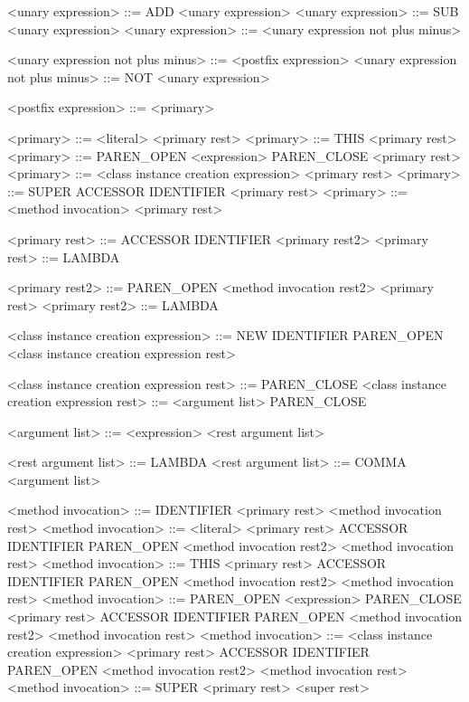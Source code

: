 <unary expression>                        ::= ADD <unary expression>
<unary expression>                        ::= SUB <unary expression>
<unary expression>                        ::= <unary expression not plus minus>

<unary expression not plus minus>         ::= <postfix expression>
<unary expression not plus minus>         ::= NOT <unary expression>

<postfix expression>                      ::= <primary>

<primary>                                 ::= <literal> <primary rest>
<primary>                                 ::= THIS <primary rest>
<primary>                                 ::= PAREN_OPEN <expression> PAREN_CLOSE <primary rest>
<primary>                                 ::= <class instance creation expression> <primary rest>
<primary>                                 ::= SUPER ACCESSOR IDENTIFIER <primary rest>
<primary>                                 ::= <method invocation> <primary rest>

<primary rest>                            ::= ACCESSOR IDENTIFIER <primary rest2>
<primary rest>                            ::= LAMBDA

<primary rest2>                           ::= PAREN_OPEN <method invocation rest2> <primary rest>
<primary rest2>                           ::= LAMBDA

<class instance creation expression>      ::= NEW IDENTIFIER PAREN_OPEN <class instance creation expression rest>

<class instance creation expression rest> ::= PAREN_CLOSE
<class instance creation expression rest> ::= <argument list> PAREN_CLOSE

<argument list>                           ::= <expression> <rest argument list>

<rest argument list>                      ::= LAMBDA
<rest argument list>                      ::= COMMA <argument list>

<method invocation>                       ::= IDENTIFIER <primary rest> <method invocation rest>
<method invocation>                       ::= <literal> <primary rest> ACCESSOR IDENTIFIER PAREN_OPEN <method invocation rest2> <method invocation rest>
<method invocation>                       ::= THIS <primary rest> ACCESSOR IDENTIFIER PAREN_OPEN <method invocation rest2> <method invocation rest>
<method invocation>                       ::= PAREN_OPEN <expression> PAREN_CLOSE <primary rest> ACCESSOR IDENTIFIER PAREN_OPEN <method invocation rest2> <method invocation rest>
<method invocation>                       ::= <class instance creation expression> <primary rest> ACCESSOR IDENTIFIER PAREN_OPEN <method invocation rest2> <method invocation rest>
<method invocation>                       ::= SUPER <primary rest> <super rest>

